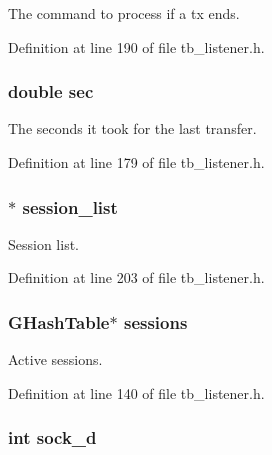 The command to process if a tx ends. 



Definition at line 190 of file tb\-\_\-listener.\-h.

\hypertarget{structtb__listener__t_a741d9964fa8029b9468528756ea835af}{
\subsubsection[{sec}]{\setlength{\rightskip}{0pt plus 5cm}double sec}}\label{structtb__listener__t_a741d9964fa8029b9468528756ea835af}


The seconds it took for the last transfer. 



Definition at line 179 of file tb\-\_\-listener.\-h.

\hypertarget{structtb__listener__t_a948f8e60166821d3db232c56a59b195c}{
\subsubsection[{session\-\_\-list}]{$\ast$ session\-\_\-list}}\label{structtb__listener__t_a948f8e60166821d3db232c56a59b195c}


Session list. 



Definition at line 203 of file tb\-\_\-listener.\-h.

\hypertarget{structtb__listener__t_a696d2a3fd36c8895302b9372d1e55935}{
\subsubsection[{sessions}]{\setlength{\rightskip}{0pt plus 5cm}G\-Hash\-Table$\ast$ sessions}}\label{structtb__listener__t_a696d2a3fd36c8895302b9372d1e55935}


Active sessions. 



Definition at line 140 of file tb\-\_\-listener.\-h.

\hypertarget{structtb__listener__t_a94d540b145f21be2f9b28a2c225ccf30}{
\subsubsection[{sock\-\_\-d}]{\setlength{\rightskip}{0pt plus 5cm}int sock\-\_\-d}}\label{structtb__listener__t_a94d540b145f21be2f9b28a2c225ccf30}


